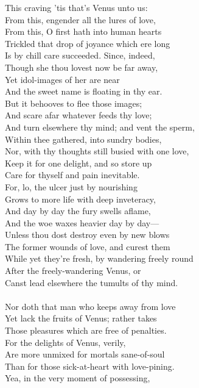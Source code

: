 This craving 'tis that's Venus unto us:\\
From this, engender all the lures of love,\\
From this, O first hath into human hearts\\
Trickled that drop of joyance which ere long\\
Is by chill care succeeded. Since, indeed,\\
Though she thou lovest now be far away,\\
Yet idol-images of her are near\\
And the sweet name is floating in thy ear.\\
But it behooves to flee those images;\\
And scare afar whatever feeds thy love;\\
And turn elsewhere thy mind; and vent the sperm,\\
Within thee gathered, into sundry bodies,\\
Nor, with thy thoughts still busied with one love,\\
Keep it for one delight, and so store up\\
Care for thyself and pain inevitable.\\
For, lo, the ulcer just by nourishing\\
Grows to more life with deep inveteracy,\\
And day by day the fury swells aflame,\\
And the woe waxes heavier day by day—\\
Unless thou dost destroy even by new blows\\
The former wounds of love, and curest them\\
While yet they're fresh, by wandering freely round\\
After the freely-wandering Venus, or\\
Canst lead elsewhere the tumults of thy mind.\\
\\
Nor doth that man who keeps away from love\\
Yet lack the fruits of Venus; rather takes\\
Those pleasures which are free of penalties.\\
For the delights of Venus, verily,\\
Are more unmixed for mortals sane-of-soul\\
Than for those sick-at-heart with love-pining.\\
Yea, in the very moment of possessing,\\

